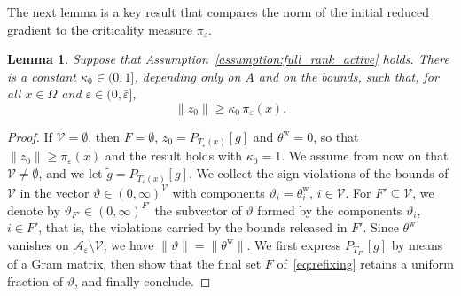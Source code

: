 \documentclass[pdflatex,sn-mathphys-num]{sn-jnl}%
\theoremstyle{thmstyleone}%
\newtheorem{lemma}[theorem]{Lemma}
\newcommand{\calA}{{\mathcal{A}}}
\newcommand{\proj}[2]{P_{#1} \left[ {#2} \right]} %
\begin{document}
The next lemma is a key result that compares the norm of the initial reduced gradient to the criticality measure $\pi_{\varepsilon}$.
\begin{lemma}\label{lemma:initial_direction}
	Suppose that Assumption~\ref{assumption:full_rank_active} holds. There is a constant $\kappa_0 \in (0,1]$, depending only on $A$ and on the bounds, such that, for all $x \in \Omega$ and $\varepsilon \in (0,\bar\varepsilon]$,
	\[\|z_0\| \ge \kappa_0\,\pi_\varepsilon(x).\]
\end{lemma}
\begin{proof}
	If $\mathcal{V} = \emptyset$, then $F = \emptyset$, $z_0 = \proj{T_\varepsilon(x)}{g}$ and $\theta^{\mathrm{w}} = 0$, so that $\|z_0\| \ge \pi_\varepsilon(x)$ and the result holds with $\kappa_0 = 1$. We assume from now on that $\mathcal{V} \ne \emptyset$, and we let $\tilde{g} = \proj{T_\varepsilon(x)}{g}$. We collect the sign violations of the bounds of $\mathcal{V}$ in the vector $\vartheta \in (0,\infty)^{\mathcal{V}}$ with components $\vartheta_i = \theta^{\mathrm{w}}_i$, $i \in \mathcal{V}$. For $F' \subseteq \mathcal{V}$, we denote by $\vartheta_{F'} \in (0,\infty)^{F'}$ the subvector of $\vartheta$ formed by the components $\vartheta_i$, $i \in F'$, that is, the violations carried by the bounds released in $F'$. Since $\theta^{\mathrm{w}}$ vanishes on $\calA_\varepsilon\setminus\mathcal{V}$, we have $\|\vartheta\| = \|\theta^{\mathrm{w}}\|$. We first express $\proj{T_{F'}}{g}$ by means of a Gram matrix, then show that the final set $F$ of~\eqref{eq:refixing} retains a uniform fraction of $\vartheta$, and finally conclude.


\end{proof}
\end{document}
